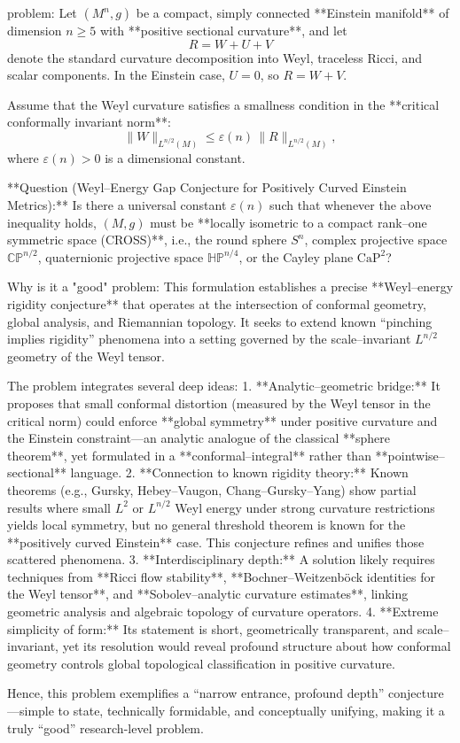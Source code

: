 problem:  
Let \((M^n, g)\) be a compact, simply connected **Einstein manifold** of dimension \(n \ge 5\) with **positive sectional curvature**, and let  
\[
R = W + U + V
\]
denote the standard curvature decomposition into Weyl, traceless Ricci, and scalar components.  
In the Einstein case, \(U = 0\), so \(R = W + V\).  

Assume that the Weyl curvature satisfies a smallness condition in the **critical conformally invariant norm**:
\[
\|W\|_{L^{n/2}(M)} \le \varepsilon(n) \, \|R\|_{L^{n/2}(M)},
\]
where \(\varepsilon(n) > 0\) is a dimensional constant.  

**Question (Weyl–Energy Gap Conjecture for Positively Curved Einstein Metrics):**  
Is there a universal constant \(\varepsilon(n)\) such that whenever the above inequality holds, \((M,g)\) must be **locally isometric to a compact rank–one symmetric space (CROSS)**, i.e., the round sphere \(S^n\), complex projective space \(\mathbb{CP}^{n/2}\), quaternionic projective space \(\mathbb{HP}^{n/4}\), or the Cayley plane \(\mathrm{CaP}^2\)?  

Why is it a "good" problem:  
This formulation establishes a precise **Weyl–energy rigidity conjecture** that operates at the intersection of conformal geometry, global analysis, and Riemannian topology. It seeks to extend known “pinching implies rigidity” phenomena into a setting governed by the scale–invariant \(L^{n/2}\) geometry of the Weyl tensor.

The problem integrates several deep ideas:
1. **Analytic–geometric bridge:** It proposes that small conformal distortion (measured by the Weyl tensor in the critical norm) could enforce **global symmetry** under positive curvature and the Einstein constraint—an analytic analogue of the classical **sphere theorem**, yet formulated in a **conformal–integral** rather than **pointwise–sectional** language.  
2. **Connection to known rigidity theory:** Known theorems (e.g., Gursky, Hebey–Vaugon, Chang–Gursky–Yang) show partial results where small \(L^2\) or \(L^{n/2}\) Weyl energy under strong curvature restrictions yields local symmetry, but no general threshold theorem is known for the **positively curved Einstein** case. This conjecture refines and unifies those scattered phenomena.  
3. **Interdisciplinary depth:** A solution likely requires techniques from **Ricci flow stability**, **Bochner–Weitzenböck identities for the Weyl tensor**, and **Sobolev–analytic curvature estimates**, linking geometric analysis and algebraic topology of curvature operators.  
4. **Extreme simplicity of form:** Its statement is short, geometrically transparent, and scale–invariant, yet its resolution would reveal profound structure about how conformal geometry controls global topological classification in positive curvature.

Hence, this problem exemplifies a “narrow entrance, profound depth” conjecture—simple to state, technically formidable, and conceptually unifying, making it a truly “good” research-level problem.